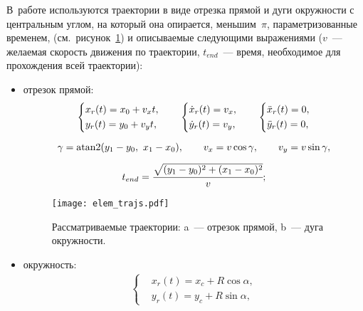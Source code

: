 \label{app_elementary_trajectories}

В~работе используются траектории в виде отрезка прямой и дуги окружности с центральным углом, на который она опирается, меньшим~$\pi$, параметризованные временем, (см.~рисунок~\ref{img_elem_trajs}) и описываемые следующими выражениями ($v$~--- желаемая скорость движения по траектории, $t_{end}$~--- время, необходимое для прохождения всей траектории):
\begin{itemize}
    \item отрезок прямой:
    \begin{gather}
        \left\{
        \begin{aligned}
            & x_{r}(t) = x_0 + v_x t, \\
            & y_{r}(t) = y_0 + v_y t,
        \end{aligned}
        \right.
        \qquad
        \left\{
        \begin{aligned}
            & \dot{x}_{r}(t) = v_x, \\
            & \dot{y}_{r}(t) = v_y,
        \end{aligned}
        \right.
        \qquad
        \left\{
        \begin{aligned}
            & \ddot{x}_{r}(t) = 0, \\
            & \ddot{y}_{r}(t) = 0,
        \end{aligned}
        \right.
        \\[0.2cm]
        \gamma = \atan2(y_1 - y_0,\ x_1 - x_0),
        \qquad
        v_x = v \cos \gamma,
        \qquad
        v_y = v \sin \gamma,
        \\[0.2cm]
        t_{end} = \cfrac{\sqrt{(y_1 - y_0)^2 + (x_1 - x_0)^2}}{v} ;
    \end{gather}
    \begin{figure}[h]
        \centering
        \texttt{[image: elem\_trajs.pdf]}
        \caption{Рассматриваемые траектории: a~--- отрезок прямой, b~--- дуга окружности.}
        \label{img_elem_trajs}
    \end{figure}
    \item окружность:
    \begin{gather}
         \left\{
         \begin{aligned}
             & x_{r}(t) = x_c + R \cos \alpha, \\
             & y_{r}(t) = y_c + R \sin \alpha,
         \end{aligned}

\end{gather}
\end{itemize}
